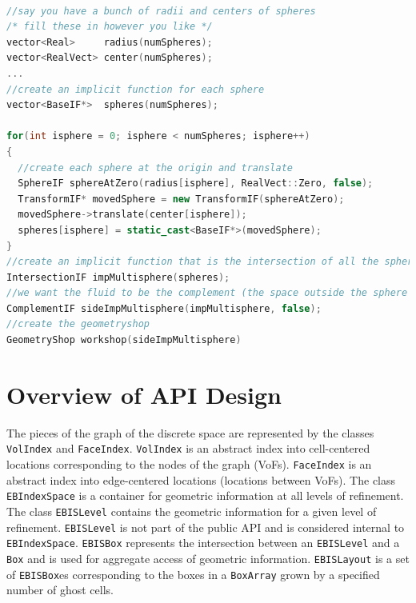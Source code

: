 \begin{lstlisting}[language=cpp]

//say you have a bunch of radii and centers of spheres
/* fill these in however you like */
vector<Real>     radius(numSpheres);
vector<RealVect> center(numSpheres);
...
//create an implicit function for each sphere
vector<BaseIF*>  spheres(numSpheres);

for(int isphere = 0; isphere < numSpheres; isphere++)
{
  //create each sphere at the origin and translate
  SphereIF sphereAtZero(radius[isphere], RealVect::Zero, false);
  TransformIF* movedSphere = new TransformIF(sphereAtZero);
  movedSphere->translate(center[isphere]);
  spheres[isphere] = static_cast<BaseIF*>(movedSphere);
}
//create an implicit function that is the intersection of all the spheres
IntersectionIF impMultisphere(spheres);
//we want the fluid to be the complement (the space outside the sphere
ComplementIF sideImpMultisphere(impMultisphere, false);
//create the geometryshop
GeometryShop workshop(sideImpMultisphere)
\end{lstlisting}
\newpage
\section{Overview of API Design}
\label{sec::overview}

The pieces of the graph of the discrete space are represented by the
classes {\tt VolIndex} and {\tt FaceIndex}.   {\tt VolIndex} is an
abstract index into cell-centered locations corresponding to the nodes
of the graph (VoFs).   {\tt FaceIndex} is an abstract index into
edge-centered locations (locations between VoFs). The class {\tt
EBIndexSpace} is a container for geometric information at all levels
of refinement. The class {\tt EBISLevel} contains the geometric
information for a given level of refinement.  {\tt EBISLevel} is not
part of the public API and is considered internal to {\tt
EBIndexSpace}.  {\tt EBISBox} represents the intersection between an
{\tt EBISLevel} and a {\tt Box} and is used for aggregate access of
geometric information.   {\tt EBISLayout} is a set of {\tt EBISBox}es
corresponding to the boxes in a {\tt BoxArray} grown by a
specified number of ghost cells. 

